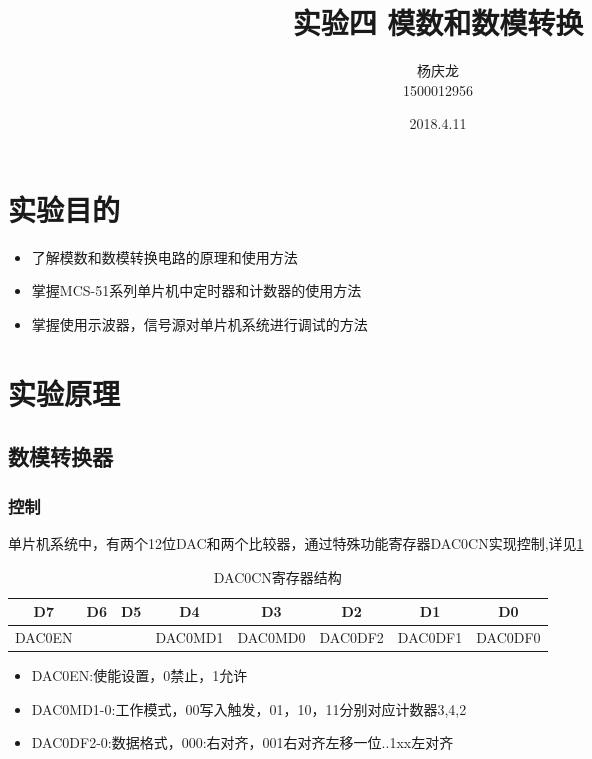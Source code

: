 \documentclass{article}
\begin{document}

\begin{CJK}{UTF8}{gkai}
\title{实验四 模数和数模转换}
\author{杨庆龙 \\1500012956}
\date{2018.4.11}
\maketitle
\section{实验目的}
\begin{itemize}
	\item 了解模数和数模转换电路的原理和使用方法
	\item 掌握MCS-51系列单片机中定时器和计数器的使用方法
	\item 掌握使用示波器，信号源对单片机系统进行调试的方法
\end{itemize}
\vspace{3mm}

\section{实验原理}
\subsection{数模转换器}
\subsubsection{控制}
单片机系统中，有两个12位DAC和两个比较器，通过特殊功能寄存器DAC0CN实现控制,详见\ref{table_DAC0CN}
\begin{table}[!htbp]
  \centering
  \caption{DAC0CN寄存器结构}
  \label{table_DAC0CN}
\begin{tabular}{|c|c|c|c|c|c|c|c|}
  \hline
  D7&D6&D5&D4&D3&D2&D1&D0\\
	  \hline
  DAC0EN&&&DAC0MD1&DAC0MD0&DAC0DF2&DAC0DF1&DAC0DF0\\
	  \hline
\end{tabular}
\end{table}
\begin{itemize}
  \item DAC0EN:使能设置，0禁止，1允许
  \item DAC0MD1-0:工作模式，00写入触发，01，10，11分别对应计数器3,4,2
  \item DAC0DF2-0:数据格式，000:右对齐，001右对齐左移一位..1xx左对齐
\end{itemize}

\end{CJK}
\end{document}
